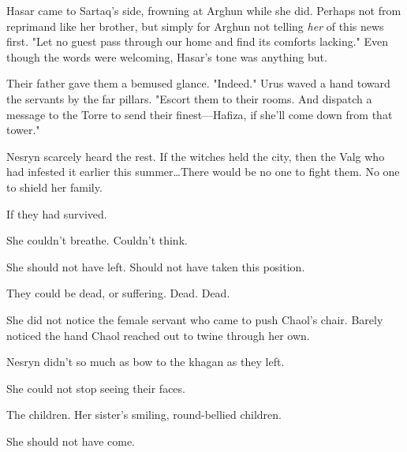 Hasar came to Sartaq's side, frowning at Arghun while she did.
Perhaps not from reprimand like her brother, but simply for Arghun not telling \emph{her} of this news first.
"Let no guest pass through our home and find its comforts lacking."
Even though the words were welcoming, Hasar's tone was anything but.

Their father gave them a bemused glance.
"Indeed."
Urus waved a hand toward the servants by the far pillars.
"Escort them to their rooms.
And dispatch a message to the Torre to send their finest---Hafiza, if she'll come down from that tower."

Nesryn scarcely heard the rest.
If the witches held the city, then the Valg who had infested it earlier this summer\ldots There would be no one to fight them.
No one to shield her family.

If they had survived.

She couldn't breathe.
Couldn't think.

She should not have left.
Should not have taken this position.

They could be dead, or suffering.
Dead.
Dead.

She did not notice the female servant who came to push Chaol's chair.
Barely noticed the hand Chaol reached out to twine through her own.

Nesryn didn't so much as bow to the khagan as they left.

She could not stop seeing their faces.

The children.
Her sister's smiling, round-bellied children.

She should not have come.

